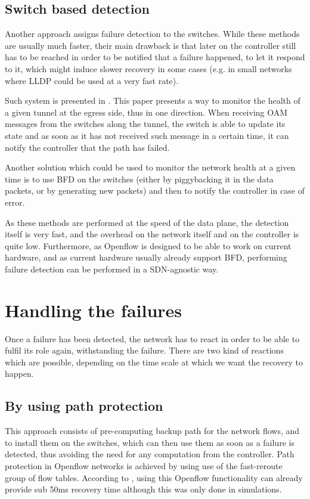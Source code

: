 \documentclass[]{IEEEtran}
\begin{document}
\subsection{Switch based detection}
Another approach assigns failure detection to the switches. While these methods are usually much faster, their main drawback is that later on the controller still has to be reached in order to be notified that a failure happened, to let it respond to it, which might induce slower recovery in some cases (e.g. in small networks where LLDP could be used at a very fast rate).

Such system is presented in \cite{6364688}. This paper presents a way to monitor the health of a given tunnel at the egress side, thus in one direction. When receiving OAM messages from the switches along the tunnel, the switch is able to update its state and as soon as it has not received such message in a certain time, it can notify the controller that the path has failed.

Another solution which could be used to monitor the network health at a given time is to use BFD\cite{rfc5880} on the switches (either by piggybacking it in the data packets, or by generating new packets) and then to notify the controller in case of error.

As these methods are performed at the speed of the data plane, the detection itself is very fast, and the overhead on the network itself and on the controller is quite low. Furthermore, as Openflow is designed to be able to work on current hardware, and as current hardware usually already support BFD, performing failure detection can be performed in a SDN-agnostic way.

\section{Handling the failures}
Once a failure has been detected, the network has to react in order to be able to fulfil its role again, withstanding the failure. There are two kind of reactions which are possible, depending on the time scale at which we want the recovery to happen.

\subsection{By using path protection}
This approach consists of pre-computing backup path for the network flows, and to install them on the switches, which can then use them as soon as a failure is detected, thus avoiding the need for any computation from the controller. Path protection in Openflow networks is achieved by using use of the fast-reroute group of flow tables. According to \cite{Sharma:2013:OMC:2445634.2445903}, using this Openflow functionality can already provide sub 50ms recovery time although this was only done in simulations.
\end{document}
